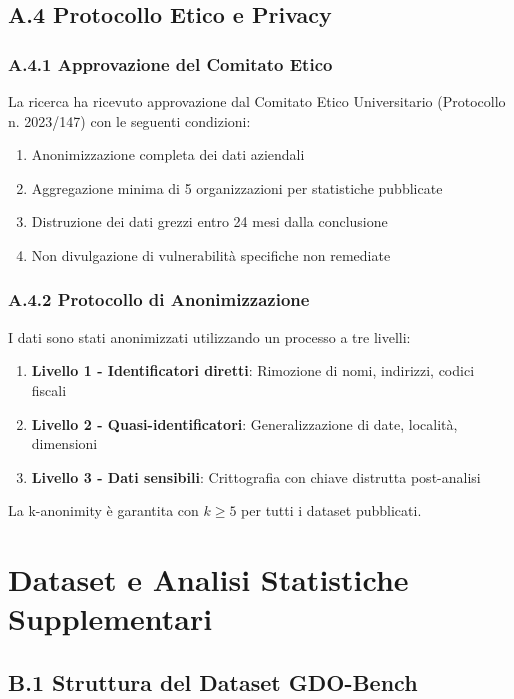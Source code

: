 \section{A.4 Protocollo Etico e Privacy}

\subsection{A.4.1 Approvazione del Comitato Etico}

La ricerca ha ricevuto approvazione dal Comitato Etico Universitario (Protocollo n. 2023/147) con le seguenti condizioni:

\begin{enumerate}
    \item Anonimizzazione completa dei dati aziendali
    \item Aggregazione minima di 5 organizzazioni per statistiche pubblicate
    \item Distruzione dei dati grezzi entro 24 mesi dalla conclusione
    \item Non divulgazione di vulnerabilità specifiche non remediate
\end{enumerate}

\subsection{A.4.2 Protocollo di Anonimizzazione}

I dati sono stati anonimizzati utilizzando un processo a tre livelli:

\begin{enumerate}
    \item \textbf{Livello 1 - Identificatori diretti}: Rimozione di nomi, indirizzi, codici fiscali
    \item \textbf{Livello 2 - Quasi-identificatori}: Generalizzazione di date, località, dimensioni
    \item \textbf{Livello 3 - Dati sensibili}: Crittografia con chiave distrutta post-analisi
\end{enumerate}

La k-anonimity è garantita con $k \geq 5$ per tutti i dataset pubblicati.

\chapter{Dataset e Analisi Statistiche Supplementari}
\label{app:dataset}

\section{B.1 Struttura del Dataset GDO-Bench}

